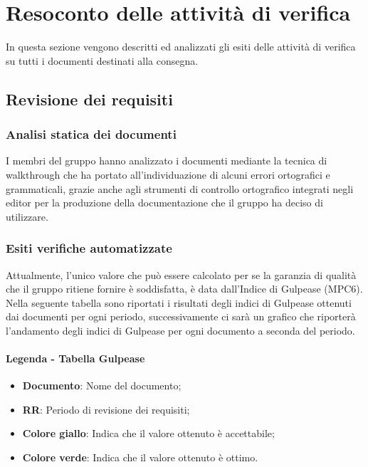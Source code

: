 \section{Resoconto delle attività di verifica}
In questa sezione vengono descritti ed analizzati gli esiti delle attività di verifica su tutti i documenti destinati alla consegna.

\subsection{Revisione dei requisiti}

\subsubsection{Analisi statica dei documenti}
I membri del gruppo \Gruppo{} hanno analizzato i documenti mediante la tecnica di walkthrough che ha portato all'individuazione di 
alcuni errori ortografici e grammaticali, grazie anche agli strumenti di controllo ortografico integrati negli editor per la produzione
della documentazione che il gruppo ha deciso di utilizzare.

\subsubsection{Esiti verifiche automatizzate}
Attualmente, l'unico valore che può essere calcolato per  se la garanzia di qualità che il gruppo ritiene fornire è
soddisfatta, è data dall'Indice di Gulpease (MPC6).
Nella seguente tabella sono riportati i risultati degli indici di Gulpease ottenuti dai documenti per ogni periodo, successivamente ci sarà un grafico che riporterà l'andamento degli indici di Gulpease per ogni documento a seconda del periodo.

\paragraph{Legenda - Tabella Gulpease}
\begin{itemize}
	\item \textbf{Documento}: Nome del documento;
	\item \textbf{RR}: Periodo di revisione dei requisiti;
	\item  \textbf{Colore giallo}: Indica che il valore ottenuto è accettabile;
	\item  \textbf{Colore verde}: Indica che il valore ottenuto è ottimo. 
\end{itemize}

